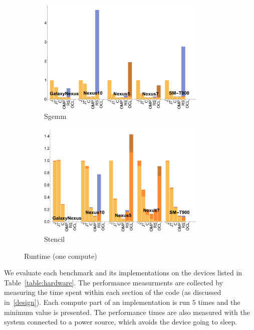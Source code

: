 \begin{figure}[ht]
  \begin{subfigure}[b]{0.5\textwidth}
      \centering
      \includegraphics[width=0.9\textwidth]{data/Sgemm_onecompute_time.pdf}
      \caption{Sgemm}\label{fig:Sgemm}
  \end{subfigure}
  \begin{subfigure}[b]{0.5\textwidth}
      \centering
      \includegraphics[width=0.9\textwidth]{data/Stencil_onecompute_time.pdf}
      \caption{Stencil}
      \label{fig:Stencil}
  \end{subfigure}

  \caption{Runtime (one compute)}
\end{figure}
\FloatBarrier

We evaluate each benchmark and its implementations on the devices listed
  in Table~\ref{table:hardware}.
The performance measurments are collected by measuring the time
  spent within each section of the code (as discussed in~\ref{design}).
Each compute part of an implementation is run $5$ %
  times and the minimum value is presented.
The performance times are also measured with the system connected to a
  power source, which avoids the device going to sleep.

